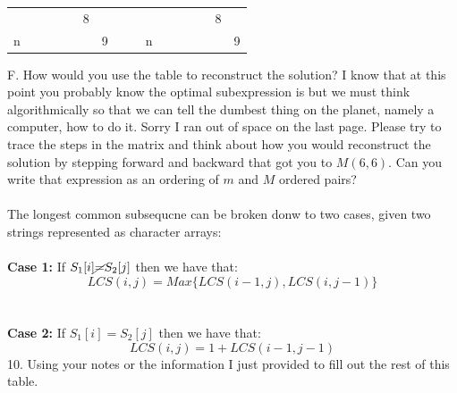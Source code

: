 \documentclass[12pt]{article}
\begin{document}
\begin{table}[]
\begin{tabular}{llllllllllllllll}
    \multicolumn{1}{l|}{}  & \multicolumn{1}{l|}{}  & \multicolumn{1}{l|}{}  & \multicolumn{1}{l|}{}    & \multicolumn{1}{l|}{}  & \multicolumn{1}{l|}{8} & \multicolumn{1}{l|}{}  &  &  & \multicolumn{1}{l|}{}  & \multicolumn{1}{l|}{}  & \multicolumn{1}{l|}{}  & \multicolumn{1}{l|}{}  & \multicolumn{1}{l|}{}  & \multicolumn{1}{l|}{8} & \multicolumn{1}{l|}{}  \\ \cline{2-7} \cline{11-16} 
    \multicolumn{1}{l|}{n} & \multicolumn{1}{l|}{}  & \multicolumn{1}{l|}{}  & \multicolumn{1}{l|}{}    & \multicolumn{1}{l|}{}  & \multicolumn{1}{l|}{}  & \multicolumn{1}{l|}{9} &  &  & \multicolumn{1}{l|}{n} & \multicolumn{1}{l|}{}  & \multicolumn{1}{l|}{}  & \multicolumn{1}{l|}{}  & \multicolumn{1}{l|}{}  & \multicolumn{1}{l|}{}  & \multicolumn{1}{l|}{9} \\ \cline{2-7} \cline{11-16} 
    \end{tabular}
    \end{table}
    \FloatBarrier
\newpage
\noindent F. How would you use the table to reconstruct the solution? I know that at this
point you probably know the optimal subexpression is but we must think algorithmically
so that we can tell the dumbest thing on the planet, namely a computer, how to
do it. Sorry I ran out of space on the last page. Please try to trace the steps in the matrix
and think about how you would reconstruct the solution by stepping forward and backward that got you
to $M(6,6)$. Can you write that expression as an ordering of $m$ and $M$ ordered pairs?\\\\
\newpage
\noindent The longest common subsequcne can be broken donw to two cases, given two strings represented as character arrays:\\\\
\textbf{Case 1: } If $S_1[i]\cancel{=}S_2[j]$ then we have that: $$LCS(i,j)=Max\{LCS(i-1,j),LCS(i,j-1)\}$$\\\\
\textbf{Case 2: } If $S_1[i]=S_2[j]$ then we have that: $$LCS(i,j)=1+ LCS(i-1,j-1)$$
10. Using your notes or the information I just provided to fill out the rest of this table.
\FloatBarrier
\end{document}
